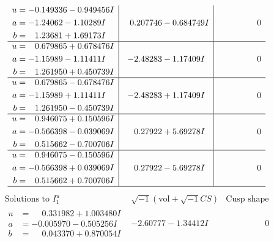 \documentclass[1p]{elsarticle_modified}
\theoremstyle{definition}
\newcommand{\I}{\sqrt{-1}}
\begin{document}
$$\begin{array}{c|c|c}
\begin{aligned}
u &= -0.149336 - 0.949456 I \\
a &= -1.24062 - 1.10289 I \\
b &= \phantom{-}1.23681 + 1.69173 I\end{aligned}
 & \phantom{-}0.207746 - 0.684749 I & \phantom{-0.000000 } 0 \\ \hline\begin{aligned}
u &= \phantom{-}0.679865 + 0.678476 I \\
a &= -1.15989 - 1.11411 I \\
b &= \phantom{-}1.261950 + 0.450739 I\end{aligned}
 & -2.48283 - 1.17409 I & \phantom{-0.000000 } 0 \\ \hline\begin{aligned}
u &= \phantom{-}0.679865 - 0.678476 I \\
a &= -1.15989 + 1.11411 I \\
b &= \phantom{-}1.261950 - 0.450739 I\end{aligned}
 & -2.48283 + 1.17409 I & \phantom{-0.000000 } 0 \\ \hline\begin{aligned}
u &= \phantom{-}0.946075 + 0.150596 I \\
a &= -0.566398 - 0.039069 I \\
b &= \phantom{-}0.515662 - 0.700706 I\end{aligned}
 & \phantom{-}0.27922 + 5.69278 I & \phantom{-0.000000 } 0 \\ \hline\begin{aligned}
u &= \phantom{-}0.946075 - 0.150596 I \\
a &= -0.566398 + 0.039069 I \\
b &= \phantom{-}0.515662 + 0.700706 I\end{aligned}
 & \phantom{-}0.27922 - 5.69278 I & \phantom{-0.000000 } 0\\
 \hline 
 \end{array}$$\newpage$$\begin{array}{c|c|c}  
\text{Solutions to }I^u_{1}& \I (\text{vol} + \sqrt{-1}CS) & \text{Cusp shape}\\
 \hline 
\begin{aligned}
u &= \phantom{-}0.331982 + 1.003480 I \\
a &= -0.005970 - 0.505256 I \\
b &= \phantom{-}0.043370 + 0.870054 I\end{aligned}
 & -2.60777 - 1.34412 I & \phantom{-0.000000 } 0 \\ \hline\begin{aligned}

\end{aligned}
\end{array}$$
\end{document}

